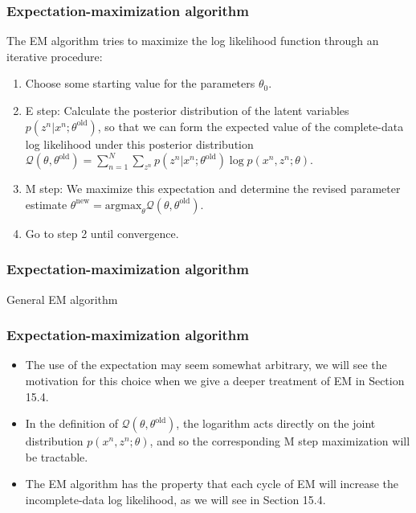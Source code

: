 \documentclass{beamer}
\begin{document}
\begin{frame}
    \frametitle{Expectation-maximization algorithm}
    The EM algorithm tries to maximize the log likelihood function through an iterative procedure:
    \begin{enumerate}
        \item Choose some starting value for the parameters $\theta_{0}$.
        \item E step: Calculate the posterior distribution of the latent variables $p(z^{n}|x^{n};\theta^{\textrm{old}})$, so that we can form the expected value of the complete-data log likelihood under this posterior distribution $\mathcal{Q}(\theta,\theta^{\textrm{old}})=\sum_{n=1}^{N}\sum_{z^{n}}p(z^{n}|x^{n};\theta^{\textrm{old}})\log{}p(x^{n},z^{n};\theta)$.
        \item M step: We maximize this expectation and determine the revised parameter estimate $\theta^{\textrm{new}}=\mathrm{argmax}_{\theta}\mathcal{Q}(\theta,\theta^{\textrm{old}})$.
        \item Go to step 2 until convergence.
    \end{enumerate}
\end{frame}

\begin{frame}
    \frametitle{Expectation-maximization algorithm}
    \begin{algorithm}[H]
        \caption{General EM algorithm}
        \;
    \end{algorithm}
\end{frame}

\begin{frame}
    \frametitle{Expectation-maximization algorithm}
    \begin{itemize}
        \item The use of the expectation may seem somewhat arbitrary, we will see the motivation for this choice when we give a deeper treatment of EM in Section 15.4.
        \item In the definition of $\mathcal{Q}(\theta,\theta^{\textrm{old}})$, the logarithm acts directly on the joint distribution $p(x^{n},z^{n};\theta)$, and so the corresponding M step maximization will be tractable.
        \item The EM algorithm has the property that each cycle of EM will increase the incomplete-data log likelihood, as we will see in Section 15.4.
    \end{itemize}
\end{frame}
\end{document}
